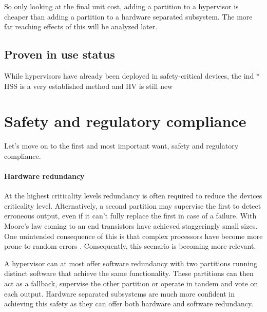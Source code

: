 
So only looking at the final unit cost, adding a partition to a hypervisor is cheaper than adding a partition to a hardware separated subsystem. The more far reaching effects of this will be analyzed later.

\subsection{Proven in use status}
While hypervisors have already been deployed in safety-critical devices, the ind
* HSS is a very established method and HV is still new

\section{Safety and regulatory compliance \label{safety-analysis}}
 Let's move on to the first and most important want, safety and regulatory compliance. 
 \paragraph{Hardware redundancy}
 At the highest criticality levels redundancy is often required to reduce the devices criticality level. Alternatively, a second partition may supervise the first to detect erroneous output, even if it can't fully replace the first in case of a failure. With Moore's law coming to an end transistors have achieved staggeringly small sizes. One unintended consequence of this is that complex processors have become more prone to random errors \cite{Constantinescu.2003}. Consequently, this scenario is becoming more relevant.
 
 A hypervisor can at most offer software redundancy with two partitions running distinct software that achieve the same functionality. These partitions can then act as a fallback, supervise the other partition or operate in tandem and vote on each output. Hardware separated subsystems are much more confident in achieving this safety as they can offer both hardware and software redundancy. 
 
